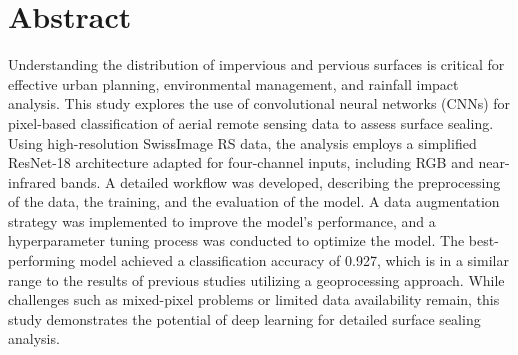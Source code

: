 

\vspace*{\fill}

\section*{Abstract}
\label{abstract}

Understanding the distribution of impervious and pervious surfaces is critical 
for effective urban planning, environmental management, and rainfall impact analysis. 
This study explores the use of convolutional neural networks (CNNs) for 
pixel-based classification of aerial remote sensing data to assess surface sealing. 
Using high-resolution SwissImage RS data, the analysis employs a simplified 
ResNet-18 architecture adapted for four-channel inputs, including RGB and 
near-infrared bands. A detailed workflow was developed, describing the 
preprocessing of the data, the training, and the evaluation of the model. 
A data augmentation strategy was implemented to improve the model's performance, 
and a hyperparameter tuning process was conducted to optimize the model. 
The best-performing model achieved a classification accuracy of 0.927, 
which is in a similar range to the results of previous studies 
utilizing a geoprocessing approach. While challenges such as mixed-pixel 
problems or limited data availability remain, this study demonstrates 
the potential of deep learning for detailed surface sealing analysis.

\vspace*{\fill}
